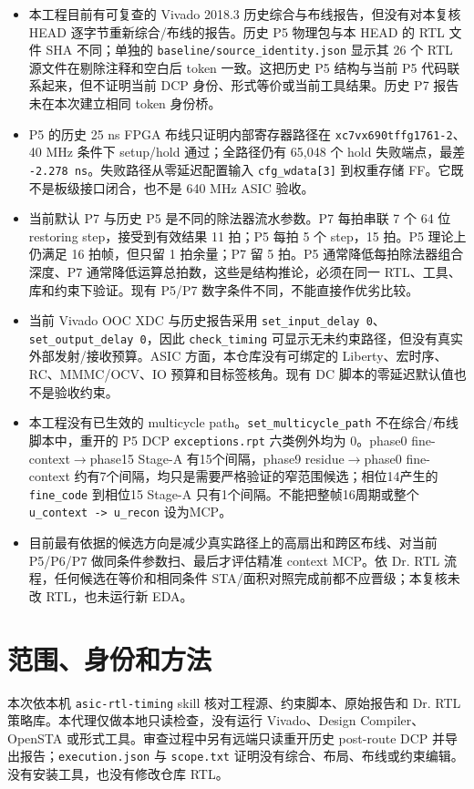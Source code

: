 \documentclass[UTF8,fontset=fandol,10pt,a4paper,openany]{ctexrep}
\newcommand{\code}[1]{\nolinkurl{#1}}
\begin{document}
\begin{itemize}
\item 本工程目前有可复查的 Vivado 2018.3 历史综合与布线报告，但没有对本复核 HEAD 逐字节重新综合/布线的报告。历史 P5 物理包与本 HEAD 的 RTL 文件 SHA 不同；单独的 \code{baseline/source_identity.json} 显示其 26 个 RTL 源文件在剔除注释和空白后 token 一致。这把历史 P5 结构与当前 P5 代码联系起来，但不证明当前 DCP 身份、形式等价或当前工具结果。历史 P7 报告未在本次建立相同 token 身份桥。
\item P5 的历史 25 ns FPGA 布线只证明内部寄存器路径在 \code{xc7vx690tffg1761-2}、40 MHz 条件下 setup/hold 通过；全路径仍有 65,048 个 hold 失败端点，最差 \code{-2.278 ns}。失败路径从零延迟配置输入 \code{cfg_wdata[3]} 到权重存储 FF。它既不是板级接口闭合，也不是 640 MHz ASIC 验收。
\item 当前默认 P7 与历史 P5 是不同的除法器流水参数。P7 每拍串联 7 个 64 位 restoring step，接受到有效结果 11 拍；P5 每拍 5 个 step，15 拍。P5 理论上仍满足 16 拍帧，但只留 1 拍余量；P7 留 5 拍。P5 通常降低每拍除法器组合深度、P7 通常降低运算总拍数，这些是结构推论，必须在同一 RTL、工具、库和约束下验证。现有 P5/P7 数字条件不同，不能直接作优劣比较。
\item 当前 Vivado OOC XDC 与历史报告采用 \code{set_input_delay 0}、\code{set_output_delay 0}，因此 \code{check_timing} 可显示无未约束路径，但没有真实外部发射/接收预算。ASIC 方面，本仓库没有可绑定的 Liberty、宏时序、RC、MMMC/OCV、IO 预算和目标签核角。现有 DC 脚本的零延迟默认值也不是验收约束。
\item 本工程没有已生效的 multicycle path。\code{set_multicycle_path} 不在综合/布线脚本中，重开的 P5 DCP \code{exceptions.rpt} 六类例外均为 0。phase0 fine-context\ensuremath{\rightarrow}phase15 Stage-A 有15个间隔，phase9 residue\ensuremath{\rightarrow}phase0 fine-context 约有7个间隔，均只是需要严格验证的窄范围候选；相位14产生的 \code{fine_code} 到相位15 Stage-A 只有1个间隔。不能把整帧16周期或整个 \code{u_context -> u_recon} 设为MCP。
\item 目前最有依据的候选方向是减少真实路径上的高扇出和跨区布线、对当前 P5/P6/P7 做同条件参数扫、最后才评估精准 context MCP。依 Dr. RTL 流程，任何候选在等价和相同条件 STA/面积对照完成前都不应晋级；本复核未改 RTL，也未运行新 EDA。
\end{itemize}


\section{范围、身份和方法}


本次依本机 \code{asic-rtl-timing} skill 核对工程源、约束脚本、原始报告和 Dr. RTL 策略库。本代理仅做本地只读检查，没有运行 Vivado、Design Compiler、OpenSTA 或形式工具。审查过程中另有远端只读重开历史 post-route DCP 并导出报告；\code{execution.json} 与 \code{scope.txt} 证明没有综合、布局、布线或约束编辑。没有安装工具，也没有修改仓库 RTL。
\end{document}
